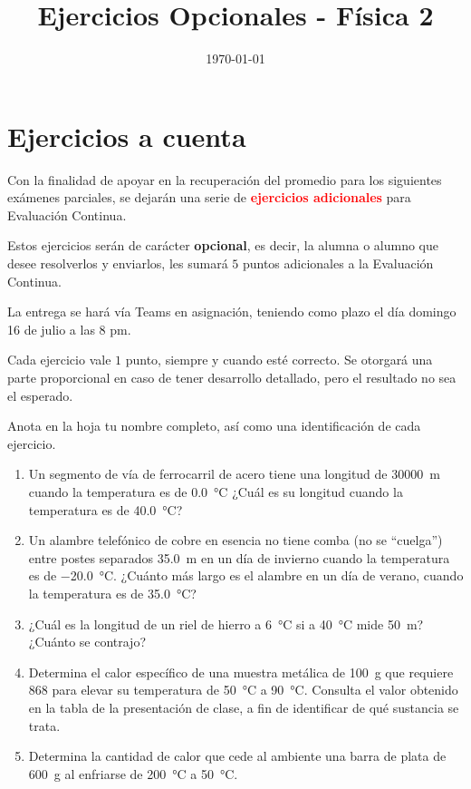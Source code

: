 \documentclass[14pt]{extarticle}
\title{\vspace*{-2cm} Ejercicios Opcionales - Física 2\vspace{-5ex}}
\date{\today}
\newcommand{\textocolor}[2]{\textbf{\textcolor{#1}{#2}}}
\begin{document}
\maketitle

\section{Ejercicios a cuenta}

Con la finalidad de apoyar en la recuperación del promedio para los siguientes exámenes parciales, se dejarán una serie de \textocolor{red}{ejercicios adicionales} para Evaluación Continua.


Estos ejercicios serán de carácter \textocolor{cobalt}{opcional}, es decir, la alumna o alumno que desee resolverlos y enviarlos, les sumará $5$ puntos adicionales a la Evaluación Continua.

La entrega se hará vía Teams en asignación, teniendo como plazo el día domingo 16 de julio a las 8 pm.

Cada ejercicio vale $1$ punto, siempre y cuando esté correcto. Se otorgará una parte proporcional en caso de tener desarrollo detallado, pero el resultado no sea el esperado.

Anota en la hoja tu nombre completo, así como una identificación de cada ejercicio.

\begin{enumerate}

\item Un segmento de vía de ferrocarril de acero tiene una longitud de \SI{30000}{\meter} cuando la temperatura es de \SI{0.0}{\degreeCelsius} ¿Cuál es su longitud cuando la temperatura es de \SI{40.0}{\degreeCelsius}?
\item Un alambre telefónico de cobre en esencia no tiene comba (no se \enquote{cuelga}) entre postes separados \SI{35.0}{\meter} en un día de invierno cuando la temperatura es de \SI{-20.0}{\degreeCelsius}. ¿Cuánto más largo es el alambre en un día de verano, cuando la temperatura es de \SI{35.0}{\degreeCelsius}?
\item¿Cuál es la longitud de un riel de hierro a \SI{6}{\degreeCelsius} si a \SI{40}{\degreeCelsius} mide \SI{50}{\meter}? ¿Cuánto se contrajo?
\item Determina el calor específico de una muestra metálica de \SI{100}{\gram} que requiere \SI{868}{\cal} para elevar su temperatura de \SI{50}{\degreeCelsius} a \SI{90}{\degreeCelsius}. Consulta el valor obtenido en la tabla de la presentación de clase, a fin de identificar de qué sustancia se trata.
\item Determina la cantidad de calor que cede al ambiente una barra de plata de \SI{600}{\gram} al enfriarse de \SI{200}{\degreeCelsius} a \SI{50}{\degreeCelsius}.




\end{enumerate}
\end{document}
